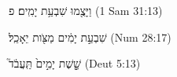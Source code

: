 
\begin{exe}

\ex\label{ex_plnum_time1}
\texthebrew{
וַיָּצֻ֖מוּ שִׁבְעַ֥ת יָמִֽים׃ פ 
} (1 Sam 31:13)

\ex\label{ex_plnum_time2}
\texthebrew{
שִׁבְעַ֣ת יָמִ֔ים מַצֹּ֖ות יֵאָכֵֽל׃ 
} (Num 28:17)

\ex\label{ex_plnum_time3}
\texthebrew{
שֵׁ֤֣שֶׁת יָמִ֣ים֙ תַּֽעֲבֹ֔ד֮ 
} (Deut 5:13)

\end{exe}
